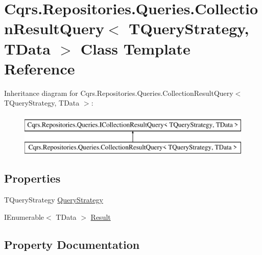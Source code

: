 \hypertarget{classCqrs_1_1Repositories_1_1Queries_1_1CollectionResultQuery}{}\section{Cqrs.\+Repositories.\+Queries.\+Collection\+Result\+Query$<$ T\+Query\+Strategy, T\+Data $>$ Class Template Reference}
\label{classCqrs_1_1Repositories_1_1Queries_1_1CollectionResultQuery}
Inheritance diagram for Cqrs.\+Repositories.\+Queries.\+Collection\+Result\+Query$<$ T\+Query\+Strategy, T\+Data $>$\+:\begin{figure}[H]
\begin{center}
\leavevmode
\includegraphics[height=2.000000cm]{classCqrs_1_1Repositories_1_1Queries_1_1CollectionResultQuery}
\end{center}
\end{figure}
\subsection*{Properties}
\begin{DoxyCompactItemize}
\item 
T\+Query\+Strategy \hyperlink{classCqrs_1_1Repositories_1_1Queries_1_1CollectionResultQuery_a717d2ce71c0849008a96f80ba58cd032_a717d2ce71c0849008a96f80ba58cd032}{Query\+Strategy}
\item 
I\+Enumerable$<$ T\+Data $>$ \hyperlink{classCqrs_1_1Repositories_1_1Queries_1_1CollectionResultQuery_af2542c8b63668ddb39c2195c3280cd89_af2542c8b63668ddb39c2195c3280cd89}{Result}
\end{DoxyCompactItemize}


\subsection{Property Documentation}
\mbox{\label{classCqrs_1_1Repositories_1_1Queries_1_1CollectionResultQuery_a717d2ce71c0849008a96f80ba58cd032_a717d2ce71c0849008a96f80ba58cd032}} 

